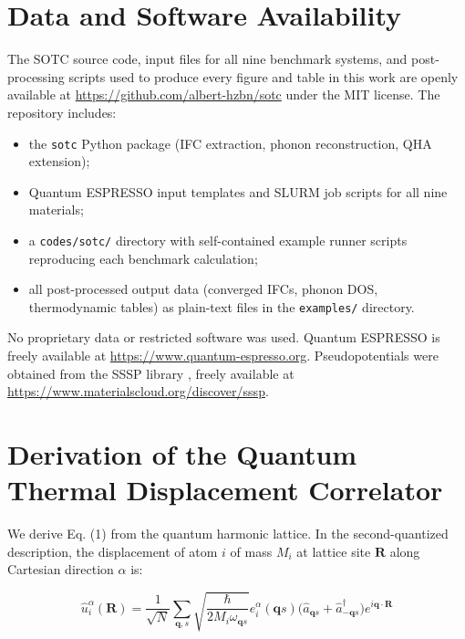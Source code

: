 \documentclass[aps,prb,reprint,amsmath,amssymb,floatfix]{revtex4-2}
\begin{document}
\section*{Data and Software Availability}

The SOTC source code, input files for all nine benchmark systems, and
post-processing scripts used to produce every figure and table in this
work are openly available at
\url{https://github.com/albert-hzbn/sotc} under the MIT license.
The repository includes:
\begin{itemize}
  \item the \texttt{sotc} Python package (IFC extraction, phonon
    reconstruction, QHA extension);
  \item Quantum ESPRESSO input templates and SLURM job scripts for all
    nine materials;
  \item a \texttt{codes/sotc/} directory with self-contained example
    runner scripts reproducing each benchmark calculation;
  \item all post-processed output data (converged IFCs, phonon DOS,
    thermodynamic tables) as plain-text files in the
    \texttt{examples/} directory.
\end{itemize}
No proprietary data or restricted software was used. Quantum ESPRESSO
\cite{ref46} is freely available at \url{https://www.quantum-espresso.org}.
Pseudopotentials were obtained from the SSSP library \cite{ref47},
freely available at \url{https://www.materialscloud.org/discover/sssp}.

\appendix

\section{Derivation of the Quantum Thermal Displacement
Correlator}\label{appendix-a-derivation-of-the-quantum-thermal-displacement-correlator}

We derive Eq. (1) from the quantum harmonic lattice. In the
second-quantized description, the displacement of atom \(i\) of mass
\(M_i\) at lattice site \(\mathbf{R}\) along Cartesian direction
\(\alpha\) is:

\begin{equation*}
\hat{u}_i^\alpha(\mathbf{R}) = \frac{1}{\sqrt{N}}\sum_{\mathbf{q},s}\sqrt{\frac{\hbar}{2M_i\omega_{\mathbf{q}s}}} e_i^\alpha(\mathbf{q}s)\bigl(\hat{a}_{\mathbf{q}s} + \hat{a}_{-\mathbf{q}s}^\dagger\bigr)e^{i\mathbf{q}\cdot\mathbf{R}}
\end{equation*}
\end{document}
